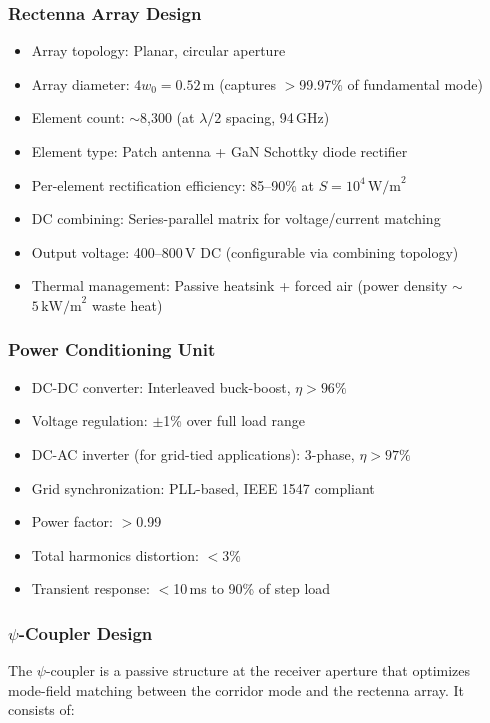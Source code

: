 \documentclass[11pt,a4paper]{article}
\begin{document}
\subsubsection{Rectenna Array Design}

\begin{itemize}
\item Array topology: Planar, circular aperture
\item Array diameter: $4w_0 = 0.52$\,m (captures $>$99.97\% of fundamental mode)
\item Element count: $\sim$8{,}300 (at $\lambda/2$ spacing, 94\,GHz)
\item Element type: Patch antenna + GaN Schottky diode rectifier
\item Per-element rectification efficiency: 85--90\% at $S = 10^4\,\text{W/m}^2$
\item DC combining: Series-parallel matrix for voltage/current matching
\item Output voltage: 400--800\,V DC (configurable via combining topology)
\item Thermal management: Passive heatsink + forced air (power density
$\sim$$5\,\text{kW/m}^2$ waste heat)
\end{itemize}

\subsubsection{Power Conditioning Unit}

\begin{itemize}
\item DC-DC converter: Interleaved buck-boost, $\eta > 96\%$
\item Voltage regulation: $\pm$1\% over full load range
\item DC-AC inverter (for grid-tied applications): 3-phase, $\eta > 97\%$
\item Grid synchronization: PLL-based, IEEE 1547 compliant
\item Power factor: $>$0.99
\item Total harmonics distortion: $<$3\%
\item Transient response: $<$10\,ms to 90\% of step load
\end{itemize}

\subsubsection{$\psi$-Coupler Design}

The $\psi$-coupler is a passive structure at the receiver aperture
that optimizes mode-field matching between the corridor mode and the
rectenna array. It consists of:
\end{document}

